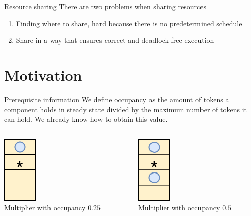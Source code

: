 \documentclass{beamer}
\begin{document}
\begin{frame}{Resource sharing}
    There are two problems when sharing resources
    \begin{enumerate}
        \item Finding where to share, hard because there is no predetermined schedule
        \item Share in a way that ensures correct and deadlock-free execution
    \end{enumerate}
\end{frame}
\section{Motivation}
\begin{frame}{Prerequisite information}
    We define occupancy as the amount of tokens a component holds in steady state divided by the maximum number of tokens it can hold. We already know how to obtain this value\footnotemark.
    \begin{columns}[T]
    \begin{column}{0.45\textwidth}
        \begin{center}
      \includegraphics[scale=0.25]{occupancy_25.png} \\
                Multiplier with occupancy $0.25$ 
    \end{center}    \end{column}
    \begin{column}{0.45\textwidth}
 \begin{center}
      \includegraphics[scale=0.25]{occupancy_50.png} \\
        Multiplier with occupancy $0.5$ 
    \end{center}
    \end{column}
  \end{columns}
\end{frame}
\end{document}
